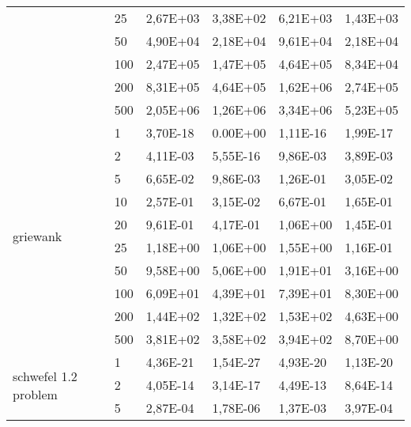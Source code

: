 \begin{longtable}[c]{|p{3.5cm}|l|l|l|l|l|}
                                       & 25        & 2,67E+03 & 3,38E+02 & 6,21E+03 & 1,43E+03 \\ \cline{2-6} 
                                       & 50        & 4,90E+04 & 2,18E+04 & 9,61E+04 & 2,18E+04 \\ \cline{2-6} 
                                       & 100       & 2,47E+05 & 1,47E+05 & 4,64E+05 & 8,34E+04 \\ \cline{2-6} 
                                       & 200       & 8,31E+05 & 4,64E+05 & 1,62E+06 & 2,74E+05 \\ \cline{2-6} 
                                       & 500       & 2,05E+06 & 1,26E+06 & 3,34E+06 & 5,23E+05 \\ \hline
\multirow[t]{10}{*}{griewank}             & 1         & 3,70E-18 & 0.00E+00 & 1,11E-16 & 1,99E-17 \\ \cline{2-6} 
                                       & 2         & 4,11E-03 & 5,55E-16 & 9,86E-03 & 3,89E-03 \\ \cline{2-6} 
                                       & 5         & 6,65E-02 & 9,86E-03 & 1,26E-01 & 3,05E-02 \\ \cline{2-6} 
                                       & 10        & 2,57E-01 & 3,15E-02 & 6,67E-01 & 1,65E-01 \\ \cline{2-6} 
                                       & 20        & 9,61E-01 & 4,17E-01 & 1,06E+00 & 1,45E-01 \\ \cline{2-6} 
                                       & 25        & 1,18E+00 & 1,06E+00 & 1,55E+00 & 1,16E-01 \\ \cline{2-6} 
                                       & 50        & 9,58E+00 & 5,06E+00 & 1,91E+01 & 3,16E+00 \\ \cline{2-6} 
                                       & 100       & 6,09E+01 & 4,39E+01 & 7,39E+01 & 8,30E+00 \\ \cline{2-6} 
                                       & 200       & 1,44E+02 & 1,32E+02 & 1,53E+02 & 4,63E+00 \\ \cline{2-6} 
                                       & 500       & 3,81E+02 & 3,58E+02 & 3,94E+02 & 8,70E+00 \\ \hline
\multirow[t]{10}{*}{schwefel 1.2 problem} & 1         & 4,36E-21 & 1,54E-27 & 4,93E-20 & 1,13E-20 \\ \cline{2-6} 
                                       & 2         & 4,05E-14 & 3,14E-17 & 4,49E-13 & 8,64E-14 \\ \cline{2-6} 
                                       & 5         & 2,87E-04 & 1,78E-06 & 1,37E-03 & 3,97E-04 \\ \cline{2-6} 

\end{longtable}
